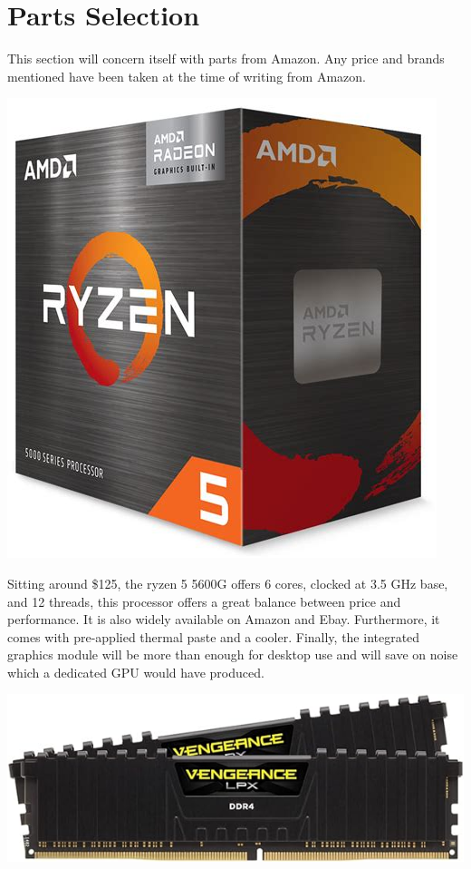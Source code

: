 \documentclass[12pt, a4paper]{article}
\begin{document}


\section{Parts Selection}
This section will concern itself with parts from Amazon. Any price
and brands mentioned have been taken at the time of writing from
Amazon.

\begin{center}
  \includegraphics[scale=0.2]{ryzen.png}
\end{center}

Sitting around \$125, the ryzen 5 5600G offers 6 cores, clocked at 3.5 GHz
base, and 12 threads, this processor offers a great balance between price
and performance. It is also widely available on Amazon and Ebay. 
Furthermore, it comes with pre-applied thermal paste and a cooler. Finally,
the integrated graphics module will be more than enough for desktop use
and will save on noise which a dedicated GPU would have produced.

\vspace{4pt}
\begin{center}
  \includegraphics[scale=0.29]{el_ram_de_comer.jpg}
\end{center}
\end{document}
